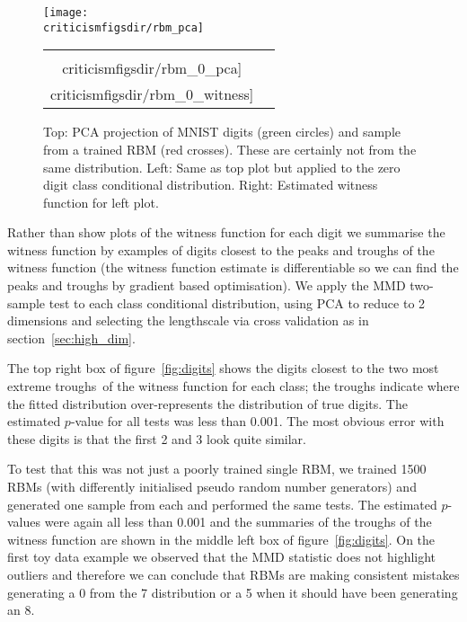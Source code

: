 \begin{figure}[ht]
  \begin{center}
  \texttt{[image: \\criticismfigsdir/rbm\_pca]}
  \end{center}
  \begin{center}
  \begin{tabular}{cc}
    \texttt{[image: \\criticismfigsdir/rbm\_0\_pca]} & 
    \texttt{[image: \\criticismfigsdir/rbm\_0\_witness]}
  \end{tabular}
  \end{center}
  \caption[PCA projections of MNIST digits and RBM samples and corresponding witness function.]{Top: PCA projection of MNIST digits (green circles) and sample from a trained RBM (red crosses). These are certainly not from the same distribution. Left: Same as top plot but applied to the zero digit class conditional distribution. Right: Estimated witness function for left plot.}
  \label{fig:criticism:rbm_pca}
\end{figure}

Rather than show plots of the witness function for each digit we summarise the witness function by examples of digits closest to the peaks and troughs of the witness function (the witness function estimate is differentiable so we can find the peaks and troughs by gradient based optimisation).
We apply the MMD two-sample test to each class conditional distribution, using PCA to reduce to 2 dimensions and selecting the lengthscale via cross validation as in section~\ref{sec:high_dim}.

The top right box of figure~\ref{fig:digits} shows the digits closest to the two most extreme troughs\footnotemark~of the witness function for each class; the troughs indicate where the fitted distribution over-represents the distribution of true digits.
The estimated $p$-value for all tests was less than 0.001.
The most obvious error with these digits is that the first 2 and 3 look quite similar.

To test that this was not just a poorly trained single RBM, we trained 1500 RBMs (with differently initialised pseudo random number generators) and generated one sample from each and performed the same tests.
The estimated $p$-values were again all less than 0.001 and the summaries of the troughs of the witness function are shown in the middle left box of figure~\ref{fig:digits}.
On the first toy data example we observed that the MMD statistic does not highlight outliers and therefore we can conclude that RBMs are making consistent mistakes \eg generating a 0 from the 7 distribution or a 5 when it should have been generating an 8.

